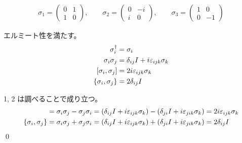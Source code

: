 \documentclass[uplatex,dvipdfmx,a4paper,11pt]{jlreq}
\makeatletter
\numberwithin{equation}{section}
\theoremstyle{definition}
\renewenvironment{proof}[1][\proofname]{\par
  \normalfont
  \topsep6\p@\@plus6\p@ \trivlist
  \item[\hskip\labelsep{\bfseries #1}\@addpunct{\bfseries}]\ignorespaces\quad\par
}{%
  \qed\endtrivlist\@endpefalse
}
\renewcommand\proofname{証明}
\makeatother
\begin{document}
\begin{definition}[パウリ行列]
  \begin{align}
    \sigma_1 = \begin{pmatrix}
                 0 & 1 \\
                 1 & 0
               \end{pmatrix}, \qquad
    \sigma_2 = \begin{pmatrix}
                 0 & -i \\
                 i & 0
               \end{pmatrix}, \qquad
    \sigma_3 = \begin{pmatrix}
                 1 & 0  \\
                 0 & -1
               \end{pmatrix}
  \end{align}
\end{definition}

\begin{proposition}[パウリ行列の性質]
  エルミート性を満たす。
  \begin{align}
    \sigma_i^\dagger         & = \sigma_i                                  \\
    \sigma_i\sigma_j         & = \delta_{ij}I + i\varepsilon_{ijk}\sigma_k \\
    [\sigma_i, \sigma_j]     & = 2i\varepsilon_{ijk}\sigma_k               \\
    \qty{\sigma_i, \sigma_j} & = 2\delta_{ij}I
  \end{align}
\end{proposition}
\begin{proof}
  1, 2 は調べることで成り立つ。
  \begin{align}
    [\sigma_i, \sigma_j]     & = \sigma_i\sigma_j - \sigma_j\sigma_i = (\delta_{ij}I + i\varepsilon_{ijk}\sigma_k) - (\delta_{ji}I + i\varepsilon_{jik}\sigma_k) = 2i\varepsilon_{ijk}\sigma_k \\
    \qty{\sigma_i, \sigma_j} & = \sigma_i\sigma_j + \sigma_j\sigma_i = (\delta_{ij}I + i\varepsilon_{ijk}\sigma_k) + (\delta_{ji}I + i\varepsilon_{jik}\sigma_k) = 2\delta_{ij}I
  \end{align}
\end{proof}
\end{document}
